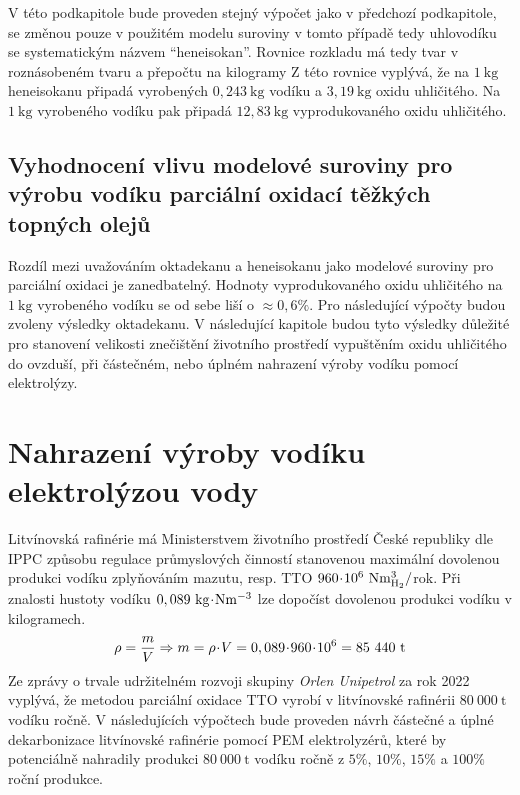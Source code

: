 V této podkapitole bude proveden stejný výpočet jako v předchozí podkapitole, se změnou pouze v použitém modelu suroviny v tomto případě tedy uhlovodíku  se systematickým názvem \enquote{heneisokan}. Rovnice rozkladu má tedy tvar
v roznásobeném tvaru a přepočtu na kilogramy
Z této rovnice vyplývá, že na $1\ \mathrm{kg}$ heneisokanu připadá vyrobených $0,243\ \mathrm{kg}$ vodíku a $3,19\ \mathrm{kg}$ oxidu uhličitého. Na $1\ \mathrm{kg}$ vyrobeného vodíku pak připadá $12,83\ \mathrm{kg}$ vyprodukovaného oxidu uhličitého.

\subsection{Vyhodnocení vlivu modelové suroviny pro výrobu vodíku parciální oxidací těžkých topných olejů}

Rozdíl mezi uvažováním oktadekanu a heneisokanu jako modelové suroviny pro parciální oxidaci je zanedbatelný. Hodnoty vyprodukovaného oxidu uhličitého na $1\ \mathrm{kg}$ vyrobeného vodíku se od sebe liší o $\approx 0,6\%$. Pro následující výpočty budou zvoleny výsledky oktadekanu. V následující kapitole budou tyto výsledky důležité pro stanovení velikosti znečištění životního prostředí vypuštěním oxidu uhličitého do ovzduší, při částečném, nebo úplném nahrazení výroby vodíku pomocí elektrolýzy.

\section{Nahrazení výroby vodíku elektrolýzou vody}

Litvínovská rafinérie má Ministerstvem životního prostředí České republiky dle IPPC způsobu regulace průmyslových činností stanovenou maximální dovolenou produkci vodíku zplyňováním mazutu, resp. \acs{TTO} $960\krat10^6\ \mathrm{Nm^3_{H_2}}/$rok. \cite{MZP2012} Při znalosti hustoty vodíku $0,089\ \mathrm{kg\!\cdot\! Nm^{-3}}$ lze dopočíst dovolenou produkci vodíku v kilogramech. \cite{IEAreview}
\begin{equation}
    \rho = \frac{m}{V} \Rightarrow m = \rho \krat V = 0,089\krat960\krat10^6 = 85\ 440\ \mathrm{t}
\end{equation}
Ze zprávy o trvale udržitelném rozvoji skupiny \textit{Orlen Unipetrol} za rok 2022 \cite{unipetrol_zprava} vyplývá, že metodou parciální oxidace \acs{TTO} vyrobí v litvínovské rafinérii $80\ 000\ \mathrm{t}$ vodíku ročně. V následujících výpočtech bude proveden návrh částečné a úplné dekarbonizace litvínovské rafinérie pomocí \acs{PEM} elektrolyzérů, které by potenciálně nahradily produkci $80\ 000\ \mathrm{t}$ vodíku ročně z $5\%$, $10\%$, $15\%$ a $100\%$ roční produkce.

